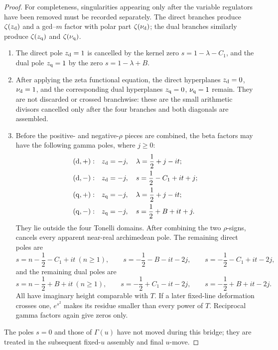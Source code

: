 \begin{proof}
For completeness, singularities appearing only after the variable
regulators have been removed must be recorded separately.  The direct
branches produce $\zeta(z_{\rm d})$ and a gcd--$m$ factor with polar part
$\zeta(\nu_{\rm d})$; the dual branches similarly produce
$\zeta(z_{\rm q})$ and $\zeta(\nu_{\rm q})$.
\begin{enumerate}[label=\textup{(\roman*)},leftmargin=8mm]
\item The direct pole $z_{\rm d}=1$ is cancelled by the kernel zero
$s=1-\lambda-C_1$, and the dual pole $z_{\rm q}=1$ by the zero
$s=1-\lambda+B$.
\item After applying the zeta functional equation, the direct hyperplanes
$z_{\rm d}=0$, $\nu_{\rm d}=1$, and the corresponding dual hyperplanes
$z_{\rm q}=0$, $\nu_{\rm q}=1$ remain.  They are not discarded or crossed
branchwise: these are the small arithmetic divisors cancelled only after
the four branches and both diagonals are assembled.
\item Before the positive- and negative-$\rho$ pieces are combined, the beta
factors may have the following gamma poles, where $j\geq0$:
\begin{align*}
 ({\rm d},+):&\quad z_{\rm d}=-j,\quad
   \lambda=\frac12+j-it;\\
 ({\rm d},-):&\quad z_{\rm d}=-j,\quad
   s=\frac12-C_1+it+j;\\
 ({\rm q},+):&\quad z_{\rm q}=-j,\quad
   \lambda=\frac12+j-it;\\
 ({\rm q},-):&\quad z_{\rm q}=-j,\quad
   s=\frac12+B+it+j.
\end{align*}
They lie outside the four Tonelli domains.  After combining the two
$\rho$-signs,  cancels every apparent near-real
archimedean pole.  The remaining direct poles are
\[
 s=n-\frac12-C_1+it\ (n\geq1),\qquad
 s=-\frac12-B-it-2j,\qquad s=-\frac12-C_1+it-2j,
\]
and the remaining dual poles are
\[
 s=n-\frac12+B+it\ (n\geq1),\qquad
 s=-\frac12+C_1-it-2j,\qquad s=-\frac12+B+it-2j.
\]
All have imaginary height comparable with $T$.  If a later fixed-line
deformation crosses one, $e^{s^2}$ makes its residue smaller than every
power of $T$.  Reciprocal gamma factors again give zeros only.
\end{enumerate}
The poles $s=0$ and those of $\Gamma(u)$ have not moved during this bridge;
they are treated in the subsequent fixed-$u$ assembly and final $u$-move.


\end{proof}
